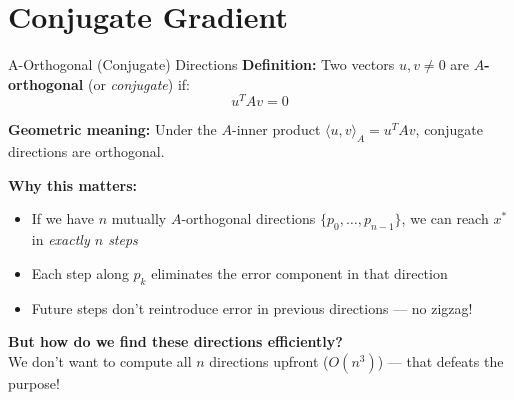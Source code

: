 \documentclass[aspectratio=169]{beamer}
\begin{document}
\section{Conjugate Gradient}

\begin{frame}{A-Orthogonal (Conjugate) Directions}
    \textbf{Definition:} Two vectors $u, v \neq 0$ are \textbf{$A$-orthogonal}
    (or \emph{conjugate}) if:
    \[
        u^T A v = 0
    \]

    \vspace{0.2cm}
    \textbf{Geometric meaning:} Under the $A$-inner product $\langle u, v \rangle_A = u^T A v$,
    conjugate directions are orthogonal.

    \pause
    \vspace{0.2cm}
    \textbf{Why this matters:}
    \begin{itemize}
        \item If we have $n$ mutually $A$-orthogonal directions $\{p_0, \ldots, p_{n-1}\}$,
              we can reach $x^*$ in \emph{exactly $n$ steps}
        \item Each step along $p_k$ eliminates the error component in that direction
        \item Future steps don't reintroduce error in previous directions --- no zigzag!
    \end{itemize}

    \pause
    \vspace{0.2cm}
    \textbf{But how do we find these directions efficiently?}\\
    We don't want to compute all $n$ directions upfront ($O(n^3)$) --- that defeats the purpose!
\end{frame}
\end{document}
